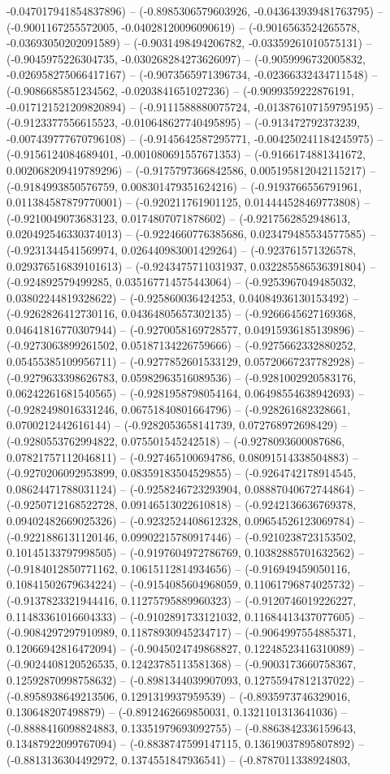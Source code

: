 -0.047017941854837896) -- (-0.8985306579603926, -0.043643939481763795) -- (-0.9001167255572005, -0.04028120096090619) -- (-0.9016563524265578, -0.03693050202091589) -- (-0.9031498494206782, -0.03359261010575131) -- (-0.9045975226304735, -0.030268284273626097) -- (-0.9059996732005832, -0.026958275066417167) -- (-0.9073565971396734, -0.02366332434711548) -- (-0.9086685851234562, -0.0203841651027236) -- (-0.9099359222876191, -0.017121521209820894) -- (-0.9111588880075724, -0.013876107159795195) -- (-0.9123377556615523, -0.010648627740495895) -- (-0.913472792373239, -0.007439777670796108) -- (-0.9145642587295771, -0.004250241184245975) -- (-0.9156124084689401, -0.001080691557671353) -- (-0.9166174881341672, 0.002068209419789296) -- (-0.9175797366842586, 0.005195812042115217) -- (-0.9184993850576759, 0.008301479351624216) -- (-0.9193766556791961, 0.011384587879770001) -- (-0.920211761901125, 0.014444528469773808) -- (-0.9210049073683123, 0.0174807071878602) -- (-0.9217562852948613, 0.020492546330374013) -- (-0.9224660776385686, 0.023479485534577585) -- (-0.9231344541569974, 0.026440983001429264) -- (-0.923761571326578, 0.029376516839101613) -- (-0.9243475711031937, 0.032285586536391804) -- (-0.924892579499285, 0.035167714575443064) -- (-0.9253967049485032, 0.03802244819328622) -- (-0.925860036424253, 0.04084936130153492) -- (-0.9262826412730116, 0.04364805657302135) -- (-0.9266645627169368, 0.04641816770307944) -- (-0.9270058169728577, 0.04915936185139896) -- (-0.9273063899261502, 0.05187134226759666) -- (-0.9275662332880252, 0.05455385109956711) -- (-0.9277852601533129, 0.05720667237782928) -- (-0.9279633398626783, 0.05982963516089536) -- (-0.9281002920583176, 0.06242261681540565) -- (-0.9281958798054164, 0.06498554638942693) -- (-0.9282498016331246, 0.06751840801664796) -- (-0.928261682328661, 0.0700212442616144) -- (-0.9282053658141739, 0.072768972698429) -- (-0.9280553762994822, 0.075501545242518) -- (-0.9278093600087686, 0.07821757112046811) -- (-0.927465100694786, 0.08091514338504883) -- (-0.9270206092953899, 0.08359183504529855) -- (-0.9264742178914545, 0.08624471788031124) -- (-0.9258246723293904, 0.08887040672744864) -- (-0.9250712168522728, 0.09146513022610818) -- (-0.9242136636769378, 0.09402482669025326) -- (-0.9232524408612328, 0.09654526123069784) -- (-0.9221886131120146, 0.09902215780917446) -- (-0.9210238723153502, 0.10145133797998505) -- (-0.9197604972786769, 0.10382885701632562) -- (-0.9184012850771162, 0.10615112814934656) -- (-0.916949459050116, 0.10841502679634224) -- (-0.9154085604968059, 0.11061796874025732) -- (-0.9137823321944416, 0.11275795889960323) -- (-0.9120746019226227, 0.11483361016604333) -- (-0.9102891733121032, 0.11684413437077605) -- (-0.9084297297910989, 0.11878930945234717) -- (-0.9064997554885371, 0.12066942816472094) -- (-0.9045024749868827, 0.12248523416310089) -- (-0.9024408120526535, 0.12423785113581368) -- (-0.9003173660758367, 0.12592870998758632) -- (-0.8981344039907093, 0.12755947812137022) -- (-0.8958938649213506, 0.1291319937959539) -- (-0.8935973746329016, 0.130648207498879) -- (-0.8912462669850031, 0.1321101313641036) -- (-0.8888416098824883, 0.13351979693092755) -- (-0.8863842336159643, 0.13487922099767094) -- (-0.8838747599147115, 0.13619037895807892) -- (-0.8813136304492972, 0.1374551847936541) -- (-0.8787011338924803, 